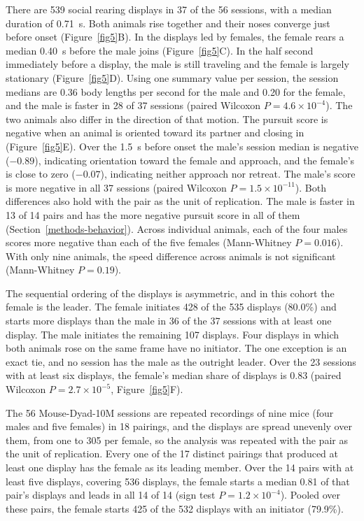 \documentclass[pdflatex, sn-nature]{sn-jnl}
\theoremstyle{thmstyleone}%
\theoremstyle{thmstyletwo}%
\theoremstyle{thmstylethree}%
\begin{document}
There are 539 social rearing displays in 37 of the 56 sessions, with a median duration of 0.71~s. Both animals rise together and their noses converge just before onset (Figure~\ref{fig5}B). In the displays led by females, the female rears a median 0.40~s before the male joins (Figure~\ref{fig5}C). In the half second immediately before a display, the male is still traveling and the female is largely stationary (Figure~\ref{fig5}D). Using one summary value per session, the session medians are 0.36 body lengths per second for the male and 0.20 for the female, and the male is faster in 28 of 37 sessions (paired Wilcoxon $P = 4.6 \times 10^{-4}$). The two animals also differ in the direction of that motion. The pursuit score is negative when an animal is oriented toward its partner and closing in (Figure~\ref{fig5}E). Over the 1.5~s before onset the male's session median is negative ($-0.89$), indicating orientation toward the female and approach, and the female's is close to zero ($-0.07$), indicating neither approach nor retreat. The male's score is more negative in all 37 sessions (paired Wilcoxon $P = 1.5 \times 10^{-11}$). Both differences also hold with the pair as the unit of replication. The male is faster in 13 of 14 pairs and has the more negative pursuit score in all of them (Section~\ref{methods-behavior}). Across individual animals, each of the four males scores more negative than each of the five females (Mann-Whitney $P = 0.016$). With only nine animals, the speed difference across animals is not significant (Mann-Whitney $P = 0.19$).

The sequential ordering of the displays is asymmetric, and in this cohort the female is the leader. The female initiates 428 of the 535 displays (80.0\%) and starts more displays than the male in 36 of the 37 sessions with at least one display. The male initiates the remaining 107 displays. Four displays in which both animals rose on the same frame have no initiator. The one exception is an exact tie, and no session has the male as the outright leader. Over the 23 sessions with at least six displays, the female's median share of displays is 0.83 (paired Wilcoxon $P = 2.7 \times 10^{-5}$, Figure~\ref{fig5}F).

The 56 Mouse-Dyad-10M sessions are repeated recordings of nine mice (four males and five females) in 18 pairings, and the displays are spread unevenly over them, from one to 305 per female, so the analysis was repeated with the pair as the unit of replication. Every one of the 17 distinct pairings that produced at least one display has the female as its leading member. Over the 14 pairs with at least five displays, covering 536 displays, the female starts a median 0.81 of that pair's displays and leads in all 14 of 14 (sign test $P = 1.2 \times 10^{-4}$). Pooled over these pairs, the female starts 425 of the 532 displays with an initiator (79.9\%).
\end{document}
